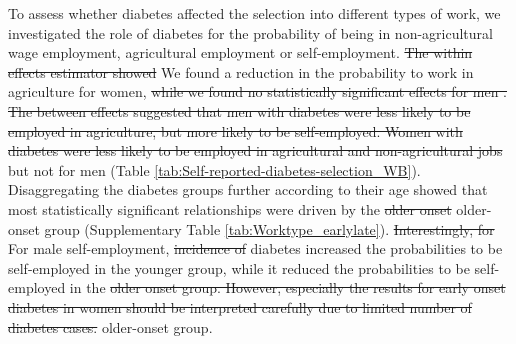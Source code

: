 \documentclass[12pt,english]{article}
\providecommand{\DIFaddtex}[1]{{\protect\color{blue}#1}} %
\providecommand{\DIFdeltex}[1]{{\protect\color{red}\sout{#1}}}                      %
\providecommand{\DIFaddbegin}{} %
\providecommand{\DIFaddend}{} %
\providecommand{\DIFdelbegin}{} %
\providecommand{\DIFdelend}{} %
\providecommand{\DIFadd}[1]{\texorpdfstring{\DIFaddtex{#1}}{#1}} %
\providecommand{\DIFdel}[1]{\texorpdfstring{\DIFdeltex{#1}}{}} %
\begin{document}
To assess whether diabetes affected the selection into different types of work, we investigated the role of diabetes for the probability of being in non-agricultural wage employment, agricultural employment or self-employment. \DIFdelbegin \DIFdel{The within effects estimator showed }\DIFdelend \DIFaddbegin \DIFadd{We found }\DIFaddend a reduction in the probability to work in agriculture for women, \DIFdelbegin \DIFdel{while we found no statistically significant effects for men . The between effects suggested that men with diabetes were less likely to be employed in agriculture, but more likely to be self-employed. Women with diabetes were less likely to be employed in agricultural and non-agricultural jobs  }\DIFdelend \DIFaddbegin \DIFadd{but not for men }\DIFaddend (Table \ref{tab:Self-reported-diabetes-selection_WB}). Disaggregating the diabetes groups further according to their age showed that most statistically significant relationships were driven by the \DIFdelbegin \DIFdel{older onset }\DIFdelend \DIFaddbegin \DIFadd{older-onset }\DIFaddend group (Supplementary Table \ref{tab:Worktype_earlylate}). \DIFdelbegin \DIFdel{Interestingly, for }\DIFdelend \DIFaddbegin \DIFadd{For }\DIFaddend male self-employment, \DIFdelbegin \DIFdel{incidence of }\DIFdelend diabetes increased the probabilities to be self-employed in the younger group, while it reduced the probabilities to be self-employed in the \DIFdelbegin \DIFdel{older onset group.
However, especially the results for early onset diabetes in women should be interpreted carefully due to limited number of diabetes cases.
}\DIFdelend \DIFaddbegin \DIFadd{older-onset group.
}\DIFaddend 
\end{document}

